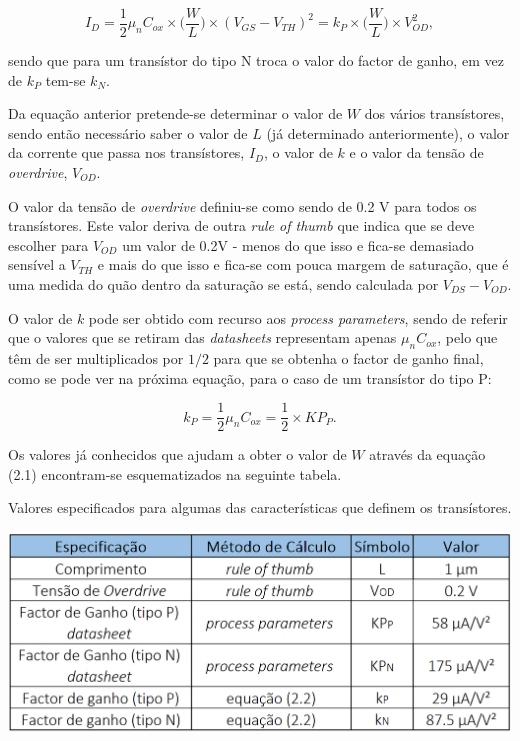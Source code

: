 \documentclass[11pt]{article}
\numberwithin{equation}{section}
\begin{document}
\vspace{-3mm}
\begin{equation}
I_{D} = \frac{1}{2}\mu_{n}C_{ox}\times \Big(\frac{W}{L}\Big) \times(V_{GS}-V_{TH})^2 = k_P \times \Big(\frac{W}{L}\Big) \times V_{OD}^2,
\label{eq:corrente}
\end{equation}

\vspace{1mm}
sendo que para um transístor do tipo N troca o valor do factor de ganho, em vez de $k_P$ tem-se $k_N$.

Da equação anterior pretende-se determinar o valor de $W$ dos vários transístores, sendo então necessário saber o valor de $L$ (já determinado anteriormente), o valor da corrente que passa nos transístores, $I_{D}$, o valor de $k$ e o valor da tensão de \textit{overdrive}, $V_{OD}$.

O valor da tensão de \textit{overdrive} definiu-se como sendo de 0.2 V para todos os transístores. Este valor deriva de outra \textit{rule of thumb} que indica que se deve escolher para $V_{OD}$ um valor de 0.2V - menos do que isso e fica-se demasiado sensível a $V_{TH}$ e mais do que isso e fica-se com pouca margem de saturação, que é uma medida do quão dentro da saturação se está, sendo calculada por $V_{DS} - V_{OD}$.

O valor de $k$ pode ser obtido com recurso aos \textit{process parameters}, sendo de referir que o valores que se retiram das \textit{datasheets} representam apenas $\mu_{n}C_{ox}$, pelo que têm de ser multiplicados por $1/2$ para que se obtenha o factor de ganho final, como se pode ver na próxima equação, para o caso de um transístor do tipo P:

\vspace{-3mm}
\begin{equation}
k_P = \frac{1}{2}\mu_{n}C_{ox} = \frac{1}{2} \times KP_P.
\end{equation}

\vspace{1mm}
Os valores já conhecidos que ajudam a obter o valor de $W$ através da equação (2.1) encontram-se esquematizados na seguinte tabela.

\begin{table}[H]
	\centering
	\caption{Valores especificados para algumas das características que definem os transístores.}
	\vspace{-1.5mm}
	\includegraphics[keepaspectratio=true, scale=0.45]{teoricas/tabela2}
\end{table}
\end{document}
